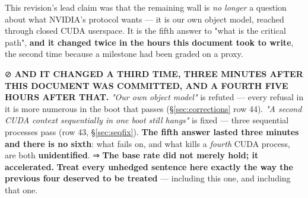\documentclass[10.5pt]{article}
\begin{document}
\begin{claimbox}
\smallskip
This revision's lead claim was that the remaining wall is \emph{no longer} a question about what
NVIDIA's protocol wants — it is our own object model, reached through closed CUDA userspace. It is
the fifth answer to "what is the critical path", \textbf{and it changed twice in the hours this
document took to write}, the second time because a milestone had been graded on a proxy.

\smallskip
⊘ \textbf{AND IT CHANGED A THIRD TIME, THREE MINUTES AFTER THIS DOCUMENT WAS COMMITTED, AND A
FOURTH FIVE HOURS AFTER THAT.} \emph{"Our own object model"} is refuted --- every refusal in it is
more numerous in the boot that passes (\S\ref{sec:corrections} row 44). \emph{"A second CUDA
context sequentially in one boot still hangs"} is fixed --- three sequential processes pass
(row 43, \S\ref{sec:seqfix}). \textbf{The fifth answer lasted three minutes and there is no
sixth}: what  fails on, and what kills a \emph{fourth} CUDA
process, are both \textbf{unidentified}. ⇒ \textbf{The base rate did not merely hold; it
accelerated.} \textbf{Treat every unhedged sentence here exactly the way the previous four
deserved to be treated} — including this one, and including that one.
\end{claimbox}
\end{document}
